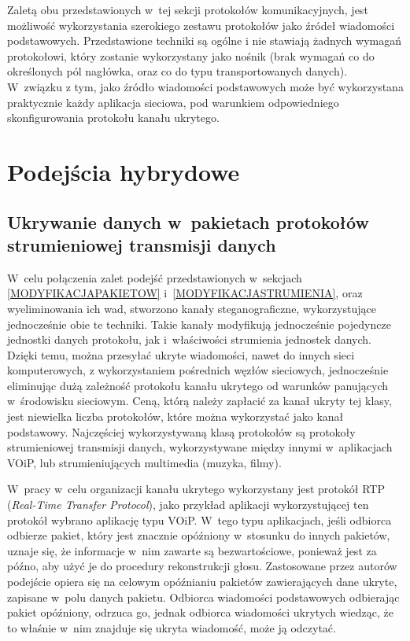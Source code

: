 \documentclass[a4paper, twoside, 12pt]{report}
\begin{document}
        Zaletą obu przedstawionych w~tej sekcji protokołów komunikacyjnych,
        jest możliwość wykorzystania szerokiego zestawu protokołów jako
        źródeł wiadomości podstawowych. Przedstawione techniki są ogólne i
        nie stawiają żadnych wymagań protokołowi, który zostanie wykorzystany jako
        nośnik (brak wymagań co do określonych pól nagłówka, oraz co do typu transportowanych danych).
        W~związku z tym, jako źródło wiadomości podstawowych może być wykorzystana
        praktycznie każdy aplikacja sieciowa, pod warunkiem odpowiedniego skonfigurowania
        protokołu kanału ukrytego.


    \section{Podejścia hybrydowe}
        \subsection{Ukrywanie danych w~pakietach protokołów strumieniowej transmisji danych}
        W~celu połączenia zalet podejść przedstawionych w~sekcjach
        \ref{MODYFIKACJAPAKIETOW} i~\ref{MODYFIKACJASTRUMIENIA}, oraz wyeliminowania
        ich wad, stworzono kanały steganograficzne, wykorzystujące jednocześnie obie te
        techniki. Takie kanały modyfikują jednocześnie pojedyncze jednostki danych protokołu,
        jak i~właściwości strumienia jednostek danych. Dzięki temu, można przesyłać ukryte wiadomości,
        nawet do innych sieci komputerowych, z wykorzystaniem pośrednich węzłów sieciowych,
        jednocześnie eliminując dużą zależność protokołu kanału ukrytego od warunków
        panujących w~środowisku sieciowym. Ceną, którą należy zapłacić za kanał
        ukryty tej klasy, jest niewielka liczba protokołów, które można wykorzystać
        jako kanał podstawowy. Najczęściej wykorzystywaną klasą protokołów są
        protokoły strumieniowej transmisji danych, wykorzystywane między innymi
        w~aplikacjach VOiP, lub strumieniujących multimedia (muzyka, filmy).

        W~pracy \cite{VOIPSTEGANOGRAPHY} w~celu organizacji kanału ukrytego wykorzystany
        jest protokół RTP (\emph{Real-Time Transfer Protocol}), jako przykład aplikacji
        wykorzystującej ten protokół wybrano aplikację typu VOiP. W~tego typu aplikacjach,
        jeśli odbiorca odbierze pakiet, który jest znacznie opóźniony w~stosunku
        do innych pakietów, uznaje się, że informacje w~nim zawarte są bezwartościowe,
        ponieważ jest za późno, aby użyć je do procedury rekonstrukcji głosu.
        Zastosowane przez autorów podejście opiera się na celowym opóźnianiu pakietów
        zawierających dane ukryte, zapisane w~polu danych pakietu.
        Odbiorca wiadomości podstawowych odbierając pakiet
        opóźniony, odrzuca go, jednak odbiorca wiadomości ukrytych wiedząc, że to właśnie
        w~nim znajduje się ukryta wiadomość, może ją odczytać.
\end{document}
